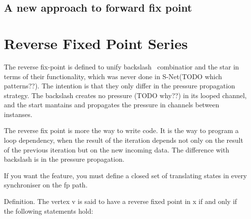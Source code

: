     \subsection{A new approach to forward fix point}
%



    \section{Reverse Fixed Point Series\label{rfp}}
The reverse fix-point is defined to unify backslash \ combinatior and the star in terms of their functionality, which was never done in S-Net(TODO which patterns??). The intention is that they only differ in the pressure propagation strategy. The backslash creates no pressure (TODO why??) in its looped channel, and the start mantains and propagates the pressure in channels between instanses.

%
%
%
%

The reverse fix point is more the way to write code. It is the way to program a loop dependency, when the result of the iteration depends not only on the result of the previous iteration but on the new incoming data. The difference with backslash is in the pressure propagation.

If you want the feature, you must define a closed set of translating states in every synchroniser on the fp path.


Definition. The vertex v is said to have a reverse fixed point in x if and only if the following statements hold:

